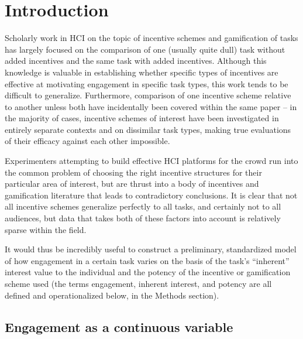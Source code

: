 \section{Introduction}

Scholarly work in HCI on the topic of incentive schemes and gamification of tasks has largely focused on the comparison of one (usually quite dull) task without added incentives and the same task with added incentives. Although this knowledge is valuable in establishing whether specific types of incentives are effective at motivating engagement in specific task types, this work tends to be difficult to generalize. Furthermore, comparison of one incentive scheme relative to another unless both have incidentally been covered within the same paper -- in the majority of cases, incentive schemes of interest have been investigated in entirely separate contexts and on dissimilar task types, making true evaluations of their efficacy against each other impossible.

Experimenters attempting to build effective HCI platforms for the crowd run into the common problem of choosing the right incentive structures for their particular area of interest, but are thrust into a body of incentives and gamification literature that leads to contradictory conclusions. It is clear that not all incentive schemes generalize perfectly to all tasks, and certainly not to all audiences, but data that takes both of these factors into account is relatively sparse within the field.

It would thus be incredibly useful to construct a preliminary, standardized model of how engagement in a certain task varies on the basis of the task's “inherent” interest value to the individual and the potency of the incentive or gamification scheme used (the terms engagement, inherent interest, and potency are all defined and operationalized below, in the Methods section). 

\subsection{Engagement as a continuous variable}

